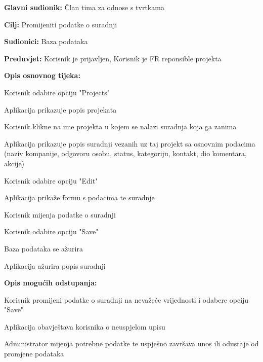 					\noindent {}
					\begin{packed_item}

						\item \textbf{Glavni sudionik:} Član tima za odnose s tvrtkama
						\item \textbf{Cilj:} Promijeniti podatke o suradnji
						\item \textbf{Sudionici:} Baza podataka
						\item \textbf{Preduvjet:} Korisnik je prijavljen, Korisnik je FR reponsible projekta
						\item \textbf{Opis osnovnog tijeka:}

						\item[] \begin{packed_enum}

							\item Korisnik odabire opciju "Projects"
							\item Aplikacija prikazuje popis projekata
							\item Korisnik klikne na ime projekta u kojem se nalazi suradnja koja ga zanima
							\item Aplikacija prikazuje popis suradnji vezanih uz taj projekt sa osnovnim podacima (naziv kompanije, odgovoru osobu, status, kategoriju, kontakt, dio komentara, akcije)
							\item Korisnik odabire opciju "Edit"
							\item Aplikacija prikaže formu s podacima te suradnje
							\item Korisnik mijenja podatke o suradnji
							\item Korisnik odabire opciju "Save"
							\item Baza podataka se ažurira
							\item Aplikacija ažurira popis suradnji

						\end{packed_enum}
						
						\item \textbf{Opis mogućih odstupanja:}

						\item[] \begin{packed_item}

							\item[7.a] Korisnik promijeni podatke o suradnji na nevažeće vrijednosti
							i odabere opciju "Save"
							
							\item[] \begin{packed_enum}

								\item Aplikacija obavještava korisnika o neuspjelom upisu
								\item Administrator mijenja potrebne podatke te uspješno završava unos ili
								odustaje od promjene podataka

							\end{packed_enum}

						\end{packed_item}
						
					\end{packed_item}

